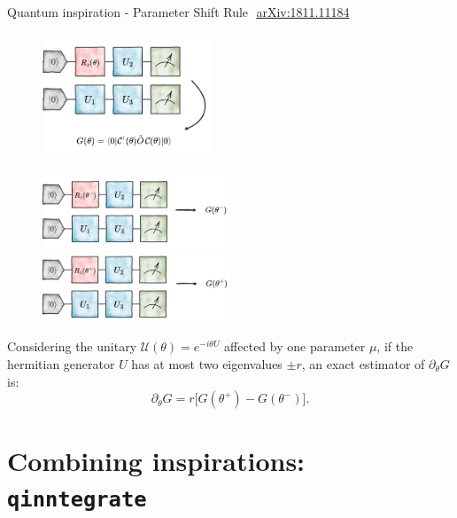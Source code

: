 \documentclass[8pt, xcolor={svgnames}, hyperref={linkcolor=black}]{beamer}
\begin{document}
\begin{frame}{Quantum inspiration - Parameter Shift Rule \hfill \faBook\,\,\href{https://arxiv.org/abs/1811.11184}{arXiv:1811.11184}}
\begin{multicols}{2}
\begin{figure}
    \includegraphics[width=0.45\textwidth]{figures/start.png}
\end{figure}
\pause
\begin{figure}  
    \includegraphics[width=0.5\textwidth]{figures/backward.png}
    \includegraphics[width=0.5\textwidth]{figures/forward.png}
\end{figure}
\end{multicols}

Considering the unitary $\mathcal{U}(\theta)=e^{-i\theta U}$ affected by one 
parameter $\mu$, if the hermitian generator $U$ has at most two eigenvalues $\pm r$,
an exact estimator of $\partial_{\theta}G$ is:
$$ \partial_\theta G = r \bigl[ G(\theta^+) - G(\theta^-) \bigr]. $$
\end{frame}

\section{Combining inspirations: \texttt{qinntegrate}}
\end{document}
